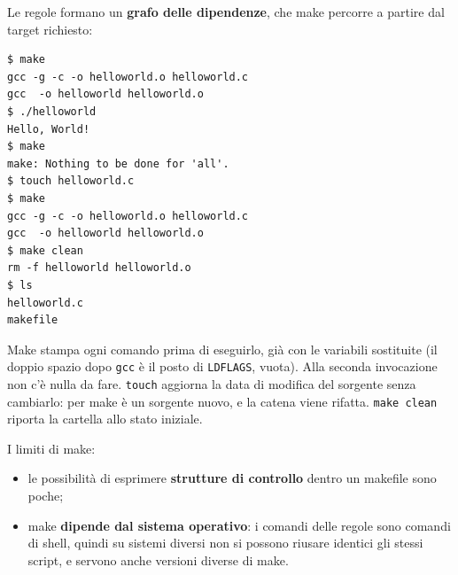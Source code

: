 Le regole formano un \textbf{grafo delle dipendenze}, che make percorre a partire dal target richiesto:

\begin{center}
\end{center}

\begin{lstlisting}[style=shell, name=Terminale]
$ make
gcc -g -c -o helloworld.o helloworld.c
gcc  -o helloworld helloworld.o
$ ./helloworld
Hello, World!
$ make
make: Nothing to be done for 'all'.
$ touch helloworld.c
$ make
gcc -g -c -o helloworld.o helloworld.c
gcc  -o helloworld helloworld.o
$ make clean
rm -f helloworld helloworld.o
$ ls
helloworld.c
makefile
\end{lstlisting}

Make stampa ogni comando prima di eseguirlo, già con le variabili sostituite (il doppio spazio dopo \texttt{gcc} è il
posto di \texttt{LDFLAGS}, vuota). Alla seconda invocazione non c'è nulla da fare. \texttt{touch} aggiorna la data di
modifica del sorgente senza cambiarlo: per make è un sorgente nuovo, e la catena viene rifatta. \texttt{make clean}
riporta la cartella allo stato iniziale.


I limiti di make:

\begin{itemize}
  \item le possibilità di esprimere \textbf{strutture di controllo} dentro un makefile sono poche;
  \item make \textbf{dipende dal sistema operativo}: i comandi delle regole sono comandi di shell, quindi su sistemi
        diversi non si possono riusare identici gli stessi script, e servono anche versioni diverse di make.
\end{itemize}

